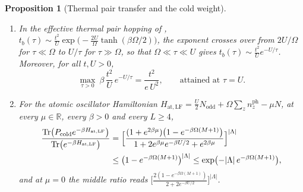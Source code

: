\documentclass[11pt]{article}
\theoremstyle{plain}
\newtheorem{proposition}[theorem]{Proposition}
\theoremstyle{definition}
\DeclareMathOperator{\Tr}{Tr}
\newcommand{\Nodd}{N_{\mathrm{odd}}}
\begin{document}
\begin{proposition}[Thermal pair transfer and the cold weight]\label{prop:thermal}
\begin{enumerate}
\item\label{it:hky} In the effective thermal pair hopping of
\cite[Appendix D]{hky}, $t_b(\tau)\sim\frac{t^{2}}{U}\exp\bigl(-\frac{2U}{\Omega}\tanh(\beta\Omega/2)\bigr)$,
the exponent crosses over from $2U/\Omega$ for $\tau\ll\Omega$ to $U/\tau$ for
$\tau\gg\Omega$, so that $\Omega\ll\tau\ll U$ gives
$t_b(\tau)\sim\frac{t^{2}}{U}e^{-U/\tau}$. Moreover, for all $t,U>0$,
\begin{equation}\label{eq:peak}
\max_{\tau>0}\ \beta\,\frac{t^{2}}{U}\,e^{-U/\tau}=\frac{t^{2}}{e\,U^{2}},
\qquad\text{attained at }\tau=U .
\end{equation}
\item\label{it:weight} For the atomic oscillator Hamiltonian
$H_{\mathrm{at,LF}}=\frac U2\Nodd+\Omega\sum_{z}n^{\mathrm{ph}}_z-\mu N$, at every
$\mu\in\mathbb R$, every $\beta>0$ and every $L\ge4$,
\begin{equation}\label{eq:weight}
\begin{aligned}
\frac{\Tr\bigl(P_{\mathrm{cold}}e^{-\beta H_{\mathrm{at,LF}}}\bigr)}
{\Tr\bigl(e^{-\beta H_{\mathrm{at,LF}}}\bigr)}
&=\Bigl[\frac{(1+e^{2\beta\mu})\bigl(1-e^{-\beta\Omega(M+1)}\bigr)}
{1+2e^{\beta\mu}e^{-\beta U/2}+e^{2\beta\mu}}\Bigr]^{|\Lambda|}\\
&\le\bigl(1-e^{-\beta\Omega(M+1)}\bigr)^{|\Lambda|}
\le\exp\bigl(-|\Lambda|\,e^{-\beta\Omega(M+1)}\bigr),
\end{aligned}
\end{equation}
and at $\mu=0$ the middle ratio reads
$\bigl[\frac{2(1-e^{-\beta\Omega(M+1)})}{2+2e^{-\beta U/2}}\bigr]^{|\Lambda|}$.
\end{enumerate}
\end{proposition}
\end{document}
